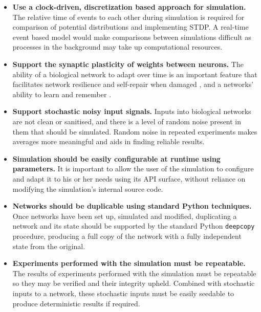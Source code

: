 \begin{itemize}
    \item \textbf{Use a clock-driven, discretization based approach for simulation.} The relative time of
          events to each other during simulation is required for comparison of
          potential distributions and implementing STDP. A real-time event based
          model would make comparisons between simulations difficult as processes in
          the background may take up computational resources.

    \item \textbf{Support the synaptic plasticity of weights between neurons.}
          The ability of a biological network to adapt over time is an important
          feature that facilitates network resilience and self-repair when damaged
          \autocite{trappenberg_fundamentals_2009}, and a networks' ability to learn
          and remember \autocite{eichenbaum_cognitive_2011}.

    \item \textbf{Support stochastic noisy input signals.} Inputs into biological
          networks are not clean or sanitised, and there is a level of random noise
          present in them that should be simulated. Random noise in repeated
          experiments makes averages more meaningful and aids in finding reliable results.

    \item \textbf{Simulation should be easily configurable at runtime using
              parameters.} It is important to allow the user of the simulation to
          configure and adapt it to his or her needs using its API surface, without
          reliance on modifying the simulation's internal source code.

    \item \textbf{Networks should be duplicable using standard Python
              techniques.} Once networks have been set up, simulated and
              modified, duplicating a network and its state should be supported
              by the standard Python \texttt{deepcopy} procedure, producing a
              full copy of the network with a fully independent state from the
              original.

    \item \textbf{Experiments performed with the simulation must be repeatable.}
          The results of experiments performed with the simulation must be
          repeatable so they may be verified and their integrity upheld.
          Combined with stochastic inputs to a network, these stochastic inputs
          must be easily seedable to produce deterministic results if required.


\end{itemize}

